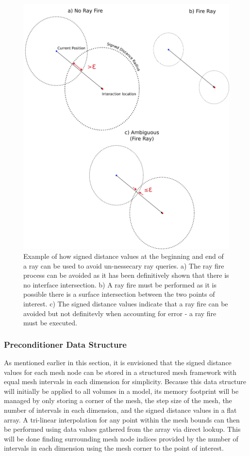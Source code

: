 \documentclass[12pt, a4paper]{article}
\begin{document}
\begin{figure}[H]
  \centering
  \includegraphics[trim = 50 0 0 0 , scale=0.6]{preconditioner_ex.png}
  \caption{Example of how signed distance values at the beginning and end of a ray can be used to avoid un-nessecary ray queries. a) The ray fire process can be avoided as it has been definitively shown that there is no interface intersection. b) A ray fire must be performed as it is possible there is a surface intersection between the two points of interest. c) The signed distance values indicate that a ray fire can be avoided but not definitevly when accounting for error - a ray fire must be executed.}
  \label{preconditioner_ex}
\end{figure}

\newpage


 \subsubsection{Preconditioner Data Structure}

 As mentioned earlier in this section, it is envisioned that the signed distance values for each mesh node can be stored in a structured mesh framework with equal mesh intervals in each dimension for simplicity. Because this data structure will initially be applied to all volumes in a model, its memory footprint will be managed by only storing a corner of the mesh, the step size of the mesh, the number of intervals in each dimension, and the signed distance values in a flat array. A tri-linear interpolation for any point within the mesh bounds can then be performed using data values gathered from the array via direct lookup. This will be done finding surrounding mesh node indices provided by the number of intervals in each dimension using the mesh corner to the point of interest.
 
\end{document}
